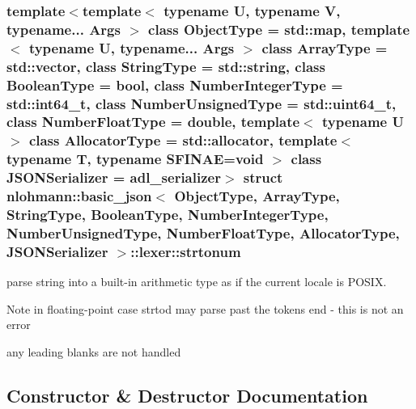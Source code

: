 \subsubsection*{template$<$template$<$ typename U, typename V, typename... Args $>$ class Object\+Type = std\+::map, template$<$ typename U, typename... Args $>$ class Array\+Type = std\+::vector, class String\+Type = std\+::string, class Boolean\+Type = bool, class Number\+Integer\+Type = std\+::int64\+\_\+t, class Number\+Unsigned\+Type = std\+::uint64\+\_\+t, class Number\+Float\+Type = double, template$<$ typename U $>$ class Allocator\+Type = std\+::allocator, template$<$ typename T, typename S\+F\+I\+N\+A\+E=void $>$ class J\+S\+O\+N\+Serializer = adl\+\_\+serializer$>$\newline
struct nlohmann\+::basic\+\_\+json$<$ Object\+Type, Array\+Type, String\+Type, Boolean\+Type, Number\+Integer\+Type, Number\+Unsigned\+Type, Number\+Float\+Type, Allocator\+Type, J\+S\+O\+N\+Serializer $>$\+::lexer\+::strtonum}

parse string into a built-\/in arithmetic type as if the current locale is P\+O\+S\+IX. 

\begin{DoxyNote}{Note}
in floating-\/point case strtod may parse past the token\textquotesingle{}s end -\/ this is not an error

any leading blanks are not handled 
\end{DoxyNote}


\subsection{Constructor \& Destructor Documentation}
\mbox{\label{structnlohmann_1_1basic__json_1_1lexer_1_1strtonum_ae065098e24b08ea79a359950190006d8}} 
